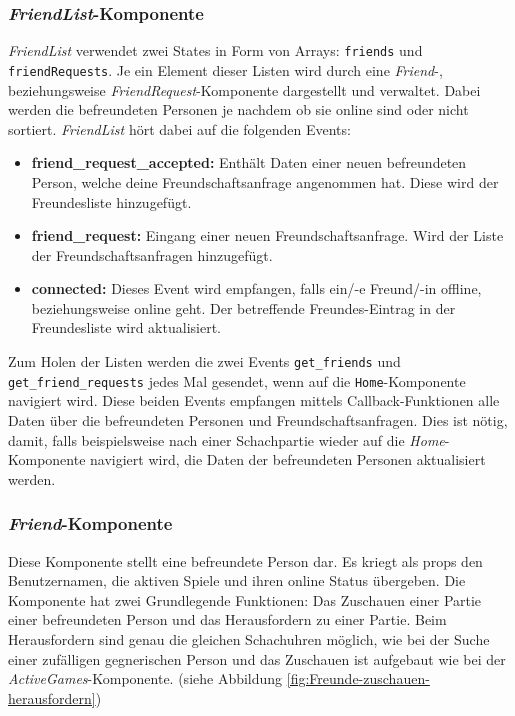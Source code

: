 \subsubsection{\textit{FriendList}-Komponente}
\label{sec:FriendList}
\textit{FriendList} verwendet zwei States in Form von Arrays: \verb|friends| und \verb|friendRequests|. Je ein Element dieser Listen wird durch eine \textit{Friend}-, beziehungsweise \textit{FriendRequest}-Komponente dargestellt und verwaltet. Dabei werden die befreundeten Personen je nachdem ob sie online sind oder nicht sortiert. \textit{FriendList} hört dabei auf die folgenden Events: 
\begin{itemize}
\item \textbf{friend\_request\_accepted:} Enthält Daten einer neuen befreundeten Person, welche deine Freundschaftsanfrage angenommen hat. Diese wird der Freundesliste hinzugefügt.
\item \textbf{friend\_request:} Eingang einer neuen Freundschaftsanfrage. Wird der Liste der Freundschaftsanfragen hinzugefügt.
\item \textbf{connected:} Dieses Event wird empfangen, falls ein/-e Freund/-in offline, beziehungsweise online geht. Der betreffende Freundes-Eintrag in der Freundesliste wird aktualisiert.
\end{itemize}

Zum Holen der Listen werden die zwei Events \verb|get_friends| und \verb|get_friend_requests| jedes Mal gesendet, wenn auf die \verb|Home|-Komponente navigiert wird. Diese beiden Events empfangen mittels Callback-Funktionen alle Daten über die befreundeten Personen und Freundschaftsanfragen. Dies ist nötig, damit, falls beispielsweise nach einer Schachpartie wieder auf die \textit{Home}-Komponente navigiert wird, die Daten der befreundeten Personen aktualisiert werden.

\subsubsection{\textit{Friend}-Komponente}
\label{sec:friend-komponente}
Diese Komponente stellt eine befreundete Person dar. Es kriegt als props den Benutzernamen, die aktiven Spiele und ihren online Status übergeben. Die Komponente hat zwei Grundlegende Funktionen: Das Zuschauen einer Partie einer befreundeten Person und das Herausfordern zu einer Partie. Beim Herausfordern sind genau die gleichen Schachuhren möglich, wie bei der Suche einer zufälligen gegnerischen Person und das Zuschauen ist aufgebaut wie bei der \textit{ActiveGames}-Komponente. (siehe Abbildung \ref{fig:Freunde-zuschauen-herausfordern})

